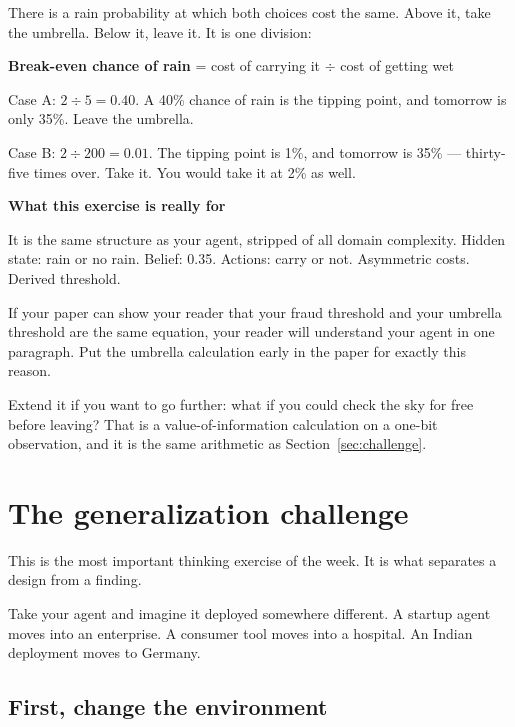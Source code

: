 \documentclass[11pt,a4paper]{article}
\newcommand{\boxtitle}[1]{{\bfseries #1}\par\vspace{2pt}}
\begin{document}
There is a rain probability at which both choices cost the same. Above it, take the umbrella.
Below it, leave it. It is one division:

\begin{sbrule}
\textbf{Break-even chance of rain} \;=\; cost of carrying it \;$\div$\; cost of getting wet
\end{sbrule}

Case A: $2 \div 5 = 0.40$. A 40\% chance of rain is the tipping point, and tomorrow is only 35\%.
Leave the umbrella.

Case B: $2 \div 200 = 0.01$. The tipping point is 1\%, and tomorrow is 35\% --- thirty-five times
over. Take it. You would take it at 2\% as well.

\begin{sbbox}
\boxtitle{What this exercise is really for}
It is the same structure as your agent, stripped of all domain complexity. Hidden state: rain or
no rain. Belief: 0.35. Actions: carry or not. Asymmetric costs. Derived threshold.

If your paper can show your reader that your fraud threshold and your umbrella threshold are the
same equation, your reader will understand your agent in one paragraph. Put the umbrella
calculation early in the paper for exactly this reason.
\end{sbbox}

Extend it if you want to go further: what if you could check the sky for free before leaving?
That is a value-of-information calculation on a one-bit observation, and it is the same
arithmetic as Section~\ref{sec:challenge}.

\section{The generalization challenge}
\label{sec:generalization}

This is the most important thinking exercise of the week. It is what separates a design from a
finding.

Take your agent and imagine it deployed somewhere different. A startup agent moves into an
enterprise. A consumer tool moves into a hospital. An Indian deployment moves to Germany.

\subsection{First, change the environment}
\end{document}
